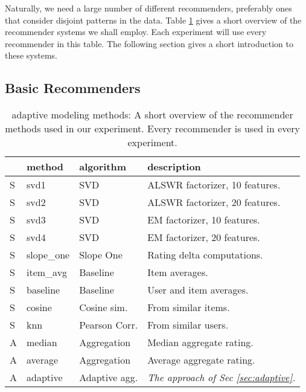 Naturally, we need a large number of different recommenders, preferably ones that consider
disjoint patterns in the data. Table \ref{table:results:methods}
gives a short overview of the recommender systems we shall employ.
Each experiment will use every recommender in this table.
The following section gives a short introduction to these systems.

\subsection{Basic Recommenders}

\begin{table}
  \caption[Adaptive Modeling Methods]{
    adaptive modeling methods: A short overview of the recommender methods
    used in our experiment.
    Every recommender is used in every experiment. 
  }
  \setlength{\extrarowheight}{0.2em}
  \vspace{1em}
  \begin{tabular*}{0.48\textwidth}{ l l l l }
    \hline
    { } & \textbf{method} & \textbf{algorithm} & \textbf{description} \\
    \hline
    S & svd1          & SVD                   & ALSWR factorizer, 10 features. \\
    S & svd2          & SVD                   & ALSWR factorizer, 20 features. \\
    S & svd3          & SVD                   & EM factorizer, 10 features. \\
    S & svd4          & SVD                   & EM factorizer, 20 features. \\
    S & slope\_one    & Slope One             & Rating delta computations. \\
    S & item\_avg     & Baseline              & Item averages. \\ 
    S & baseline      & Baseline              & User and item averages.\\ 
    S & cosine   	    & Cosine sim.           & From similar items.\\ 
    S & knn       	  & Pearson Corr.         & From similar users.\\
    \hline
    A & median    	  & Aggregation           & Median aggregate rating. \\
    A & average    	  & Aggregation           & Average aggregate rating. \\
    A & adaptive      & Adaptive agg.         & \emph{The approach of Sec \ref{sec:adaptive}.} \\
    \hline
  \end{tabular*}
  \label{table:results:methods}
\end{table}

